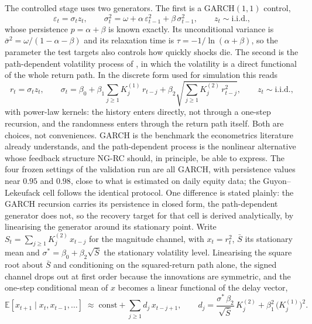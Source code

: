 \documentclass[12pt,a4paper]{article}
\begin{document}
The controlled stage uses two generators. The first is a GARCH$(1,1)$
control,
\begin{equation}
\varepsilon_t = \sigma_t z_t, \qquad
\sigma_t^2 = \omega + \alpha\,\varepsilon_{t-1}^2 + \beta\,\sigma_{t-1}^2,
\qquad z_t \sim \mathrm{i.i.d.},
\end{equation}
whose persistence $p = \alpha + \beta$ is known exactly. Its
unconditional variance is $\bar\sigma^2 = \omega/(1-\alpha-\beta)$ and
its relaxation time is $\tau = -1/\ln(\alpha+\beta)$, so the parameter
the test targets also controls how quickly shocks die. The second is the
path-dependent volatility process of \citet{guyonlekeufack2023}, in
which the volatility is a direct functional of the whole return path.
In the discrete form used for simulation this reads
\begin{equation}
r_t = \sigma_t z_t, \qquad
\sigma_t = \beta_0 + \beta_1 \sum_{j \geq 1} K^{(1)}_j\, r_{t-j}
+ \beta_2 \sqrt{\sum_{j \geq 1} K^{(2)}_j\, r_{t-j}^2},
\qquad z_t \sim \mathrm{i.i.d.},
\end{equation}
with power-law kernels: the history enters directly,
not through a one-step recursion, and the randomness enters through the
return path itself. Both are choices,
not conveniences. GARCH is the benchmark the econometrics literature
already understands, and the path-dependent process is the nonlinear
alternative whose feedback structure NG-RC should, in principle, be able
to express. The four frozen settings of the validation run are all
GARCH, with persistence values near $0.95$ and $0.98$, close to what is
estimated on daily equity data; the Guyon--Lekeufack cell follows the
identical protocol. One difference is stated plainly: the GARCH
recursion carries its persistence in closed form, the path-dependent
generator does not, so the recovery target for that cell is derived
analytically, by linearising the generator around its stationary point.
Write $S_t = \sum_{j \geq 1} K^{(2)}_j\, x_{t-j}$ for the magnitude
channel, with $x_t = r_t^2$, $\bar S$ its stationary mean and
$\sigma^* = \beta_0 + \beta_2 \sqrt{\bar S}$ the stationary volatility
level. Linearising the square root about $\bar S$ and conditioning on
the squared-return path alone, the signed channel drops out at first
order because the innovations are symmetric, and the one-step
conditional mean of $x$ becomes a linear functional of the delay vector,
\begin{equation}
\mathbb{E}[x_{t+1} \mid x_t, x_{t-1}, \dots] \;\approx\;
\mathrm{const} + \sum_{j \geq 1} d_j\, x_{t-j+1},
\qquad
d_j = \frac{\sigma^*\,\beta_2}{\sqrt{\bar S}}\, K^{(2)}_j
+ \beta_1^2\,\bigl(K^{(1)}_j\bigr)^2 .
\end{equation}
\end{document}
